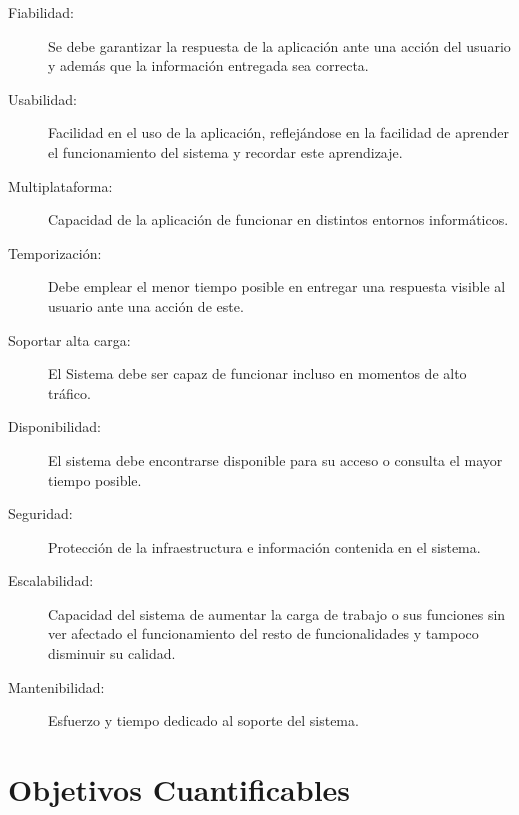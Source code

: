 \begin{description}

\item[Fiabilidad:]\hfill

Se debe garantizar la respuesta de la aplicación ante una acción del usuario y además que la información entregada sea correcta.

\item[Usabilidad:]\hfill

Facilidad en el uso de la aplicación, reflejándose en la facilidad de aprender el funcionamiento del sistema y recordar este aprendizaje.

\item[Multiplataforma:]\hfill

Capacidad de la aplicación de funcionar en distintos entornos informáticos.

\item[Temporización:]\hfill 

Debe emplear el menor tiempo posible en entregar una respuesta visible al usuario ante una acción de este.

\item[Soportar alta carga:]\hfill 

El Sistema debe ser capaz de funcionar incluso en momentos de alto tráfico. 

\item[Disponibilidad:]\hfill 

El sistema debe encontrarse disponible para su acceso o consulta el mayor tiempo posible.

\item[Seguridad:]\hfill 

Protección de la infraestructura e información contenida en el sistema.

\item[Escalabilidad:]\hfill 

Capacidad del sistema de aumentar la carga de trabajo o sus funciones sin ver afectado el funcionamiento del resto de funcionalidades y tampoco disminuir su calidad.

\item[Mantenibilidad:]\hfill

 Esfuerzo y tiempo dedicado al soporte del sistema.

\end{description}

\section{Objetivos Cuantificables}


